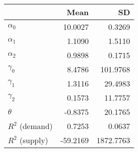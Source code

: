 
\begin{tabular}[t]{lrr}
\toprule
  & Mean & SD\\
\midrule
$\alpha_{0}$ & 10.0027 & 0.3269\\
$\alpha_{1}$ & 1.1090 & 1.5110\\
$\alpha_{2}$ & 0.9898 & 0.1715\\
$\gamma_{0}$ & 8.4786 & 101.9768\\
$\gamma_{1}$ & 1.3116 & 29.4983\\
$\gamma_{2}$ & 0.1573 & 11.7757\\
$\theta$ & -0.8375 & 20.1765\\
$R^{2}$ (demand) & 0.7253 & 0.0637\\
$R^{2}$ (supply) & -59.2169 & 1872.7763\\
\bottomrule
\end{tabular}
